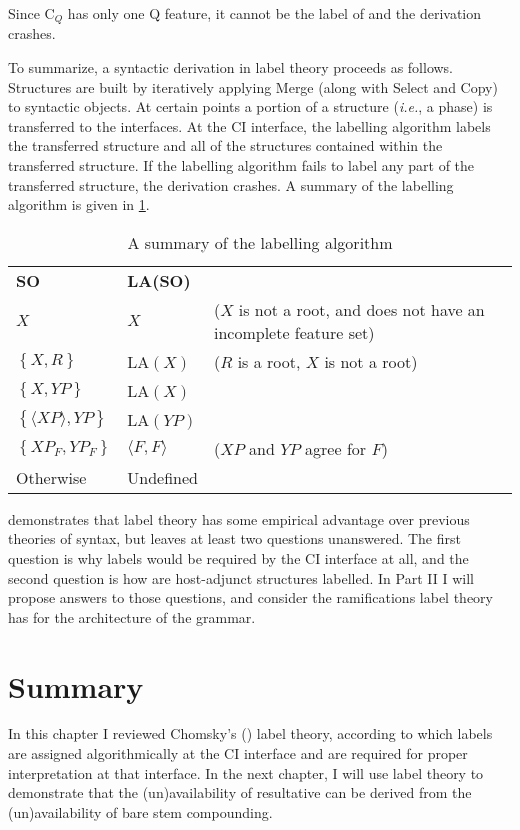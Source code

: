 \documentclass[MilwayThesis]{subfiles}
\begin{document}
Since C$_{Q}$ has only one Q feature, it cannot be the label of \Last and the derivation crashes.

To summarize, a syntactic derivation in label theory proceeds as follows.
Structures are built by iteratively applying Merge (along with Select and Copy) to syntactic objects.
At certain points a portion of a structure (\textit{i.e.}, a phase) is transferred to the interfaces.
At the CI interface, the labelling algorithm labels the transferred structure and all of the structures contained within the transferred structure.
If the labelling algorithm fails to label any part of the transferred structure, the derivation crashes.
A summary of the labelling algorithm is given in \cref{tab:LA-results}.
\begin{table}
	\centering
	\begin{tabular}[t]{llp{5cm}}
		\textbf{SO} & \textbf{LA(SO)} & \\
		\cline{1-2}
		$X$ & $X$ & ($X$ is not a root, and does not have an incomplete feature set)\\
		$\left\{ X, R \right\}$ & LA$(X)$ & ($R$ is a root, $X$ is not a root)\\
		$\left\{ X, YP \right\}$ & LA$(X)$ & \\
		$\left\{ \langle XP\rangle, YP \right\}$ & LA$(YP)$ & \\
		$\left\{ XP_F, YP_F \right\}$ & $\langle F,F\rangle$ & ($XP$ and $YP$ agree for $F$)\\
		Otherwise & Undefined &
	\end{tabular}
	\caption{A summary of the labelling algorithm}
	\label{tab:LA-results}
\end{table}

\textcite{chomsky2015problems} demonstrates that label theory has some empirical advantage over previous theories of syntax, but leaves at least two questions unanswered.
The first question is why labels would be required by the CI interface at all, and the second question is how are host-adjunct structures labelled.
In Part II I will propose answers to those questions, and consider the ramifications label theory has for the architecture of the grammar.

\section{Summary}
In this chapter I reviewed Chomsky's (\citeyear{chomsky2013problems,chomsky2015problems}) label theory, according to which labels are assigned algorithmically at the CI interface and are required for proper interpretation at that interface.
In the next chapter, I will use label theory to demonstrate that the (un)availability of resultative can be derived from the (un)availability of bare stem compounding.
\end{document}
